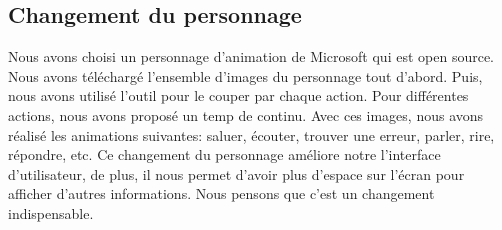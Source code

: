 \subsection{Changement du personnage}

\indent Nous avons choisi un personnage d'animation de Microsoft qui est open source. Nous avons téléchargé l'ensemble d'images du personnage tout d'abord. Puis, nous avons utilisé l'outil pour le couper par chaque action. Pour différentes actions, nous avons proposé un temp de continu. Avec ces images, nous avons réalisé les animations  suivantes: saluer, écouter, trouver une  erreur, parler, rire, répondre, etc. Ce changement du personnage améliore notre l'interface d'utilisateur, de plus, il nous permet d'avoir plus d'espace sur l'écran pour afficher d'autres informations. Nous pensons que c'est un changement indispensable.

\newpage
